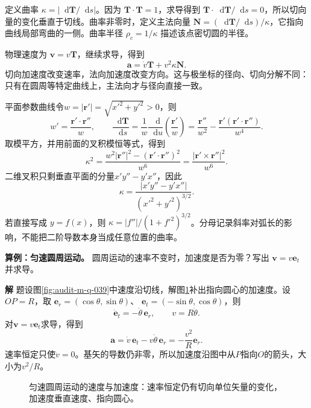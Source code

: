 \documentclass[11pt,openany,fontset=fandol]{ctexbook}
\theoremstyle{plain}\newtheorem{theorem}{定理}[chapter]\newtheorem{proposition}[theorem]{命题}
\theoremstyle{definition}\newtheorem{definition}{定义}[chapter]\newtheorem{example}{例}[chapter]
\theoremstyle{remark}\newtheorem*{remark}{说明}
\newcommand{\SolutionStart}{\par\nobreak\medskip\nobreak\noindent\textbf{解}\quad\ignorespaces}
\newenvironment{solution}{\SolutionStart}{\par\medskip}
\newcommand{\dd}{\mathop{}\!\mathrm d}\newcommand{\ii}{\mathrm i}\newcommand{\ee}{\mathrm e}
\newcommand{\vct}[1]{\bm{#1}}\newcommand{\Rea}{\operatorname{Re}}\newcommand{\Ima}{\operatorname{Im}}
\begin{document}
定义曲率 $\kappa=|\dd\vct T/\dd s|$。因为 $\vct T\cdot\vct T=1$，求导得到 $\vct T\cdot\dd\vct T/\dd s=0$，所以切向量的变化垂直于切线。曲率非零时，定义主法向量 $\vct N=(\dd\vct T/\dd s)/\kappa$，它指向曲线局部弯曲的一侧。曲率半径 $\rho_c=1/\kappa$ 描述该点密切圆的半径。

物理速度为 $\vct v=v\vct T$，继续求导，得到
\[
\vct a=\dot v\vct T+v^2\kappa\vct N.
\]
切向加速度改变速率，法向加速度改变方向。这与极坐标的径向、切向分解不同：只有在圆周等特定曲线上，主法向才与径向直接一致。

平面参数曲线令$w=|\vct r'|=\sqrt{x'^2+y'^2}>0$，则
\[w'=\frac{\vct r'\cdot\vct r''}{w},\qquad
\frac{\dd\vct T}{\dd s}
=\frac1w\frac{\dd}{\dd u}\left(\frac{\vct r'}w\right)
=\frac{\vct r''}{w^2}
-\frac{\vct r'(\vct r'\cdot\vct r'')}{w^4}.\]
取模平方，并用前面的叉积模恒等式，得到
\[\kappa^2=\frac{w^2|\vct r''|^2-(\vct r'\cdot\vct r'')^2}{w^6}
=\frac{|\vct r'\times\vct r''|^2}{w^6}.\]
二维叉积只剩垂直平面的分量$x'y''-y'x''$，因此
\[
\kappa=\frac{|x'y''-y'x''|}{(x'^2+y'^2)^{3/2}}.
\]
若直接写成 $y=f(x)$，则 $\kappa=|f''|/(1+f'^2)^{3/2}$。分母记录斜率对弧长的影响，不能把二阶导数本身当成任意位置的曲率。

\textbf{算例：匀速圆周运动。} 圆周运动的速率不变时，加速度是否为零？写出 $\vct v=v\vct e_t$ 并求导。

\begin{solution}
题设图\ref{fig:audit-m-q-039}中速度沿切线，解图\ref{fig:warm-2}补出指向圆心的加速度。设$OP=R$，取
$\vct e_r=(\cos\theta,\sin\theta)$、
$\vct e_t=(-\sin\theta,\cos\theta)$，则
\[
 \dot{\vct e}_t=-\dot\theta\,\vct e_r,\qquad v=R\dot\theta.
\]
对$\vct v=v\vct e_t$求导，得到
\[
 \vct a=\dot v\,\vct e_t-v\dot\theta\,\vct e_r
 =-\frac{v^2}{R}\vct e_r.
\]
速率恒定只使$\dot v=0$。基矢的导数仍非零，所以加速度沿图中从$P$指向$O$的箭头，大小为$v^2/R$。

\begin{figure}[H]\centering
{}
\caption{匀速圆周运动的速度与加速度：速率恒定仍有切向单位矢量的变化，加速度垂直速度、指向圆心。}\label{fig:warm-2}
\end{figure}
\end{solution}
\end{document}

